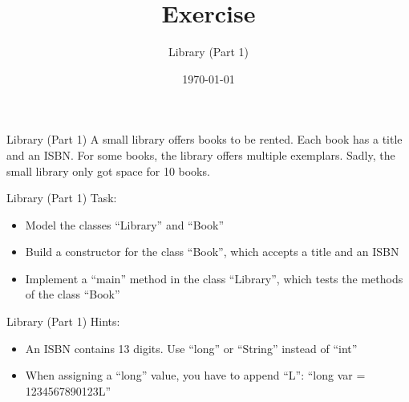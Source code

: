 


\title{Exercise}
\subtitle{Library (Part 1)}
\date{\today}




\begin{frame}
    \titlepage
\end{frame}

\begin{frame}{Library (Part 1)}
    A small library offers books to be rented. Each book has a title and an ISBN. For some books, the library offers multiple exemplars. Sadly, the small library only got space for 10 books.
\end{frame}

\begin{frame}{Library (Part 1)}
    Task:
    \begin{itemize}
        \item Model the classes ``Library'' and ``Book''
        \item Build a constructor for the class ``Book'', which accepts a title and an ISBN
        \item Implement a ``main'' method in the class ``Library'', which tests the methods of the class ``Book''
    \end{itemize}
\end{frame}

\begin{frame}{Library (Part 1)}
    Hints:
    \begin{itemize}
        \item An ISBN contains 13 digits. Use ``long'' or ``String'' instead of ``int''
        \item When assigning a ``long'' value, you have to append ``L'': ``long var = 1234567890123L''
    \end{itemize}
\end{frame}



